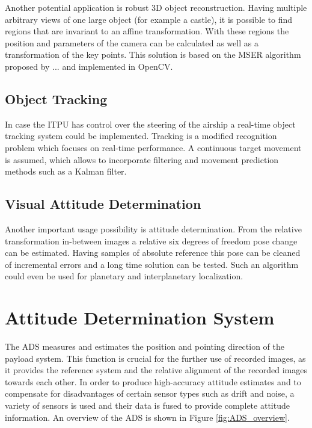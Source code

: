 Another potential application is robust 3D object reconstruction. Having multiple arbitrary views of one large object (for example a castle), it is possible to find regions that are invariant to an affine transformation. With these regions the position and parameters of the camera can be calculated as well as a transformation of the key points. This solution is based on the MSER algorithm proposed by ... and implemented in OpenCV.

\subsection{Object Tracking}

In case the \ac{ITPU} has control over the steering of the airship a real-time object tracking system could be implemented. Tracking is a modified recognition problem which focuses on real-time performance. A continuous target movement is assumed, which allows to incorporate filtering and movement prediction methods such as a Kalman filter. 

\subsection{Visual Attitude Determination}

Another important usage possibility is attitude determination. From the relative transformation in-between images a relative six degrees of freedom pose change can be estimated. Having samples of absolute reference this pose can be cleaned of incremental errors and a long time solution can be tested. Such an algorithm could even be used for planetary and interplanetary localization.

\FloatBarrier
\section{Attitude Determination System}

The \ac{ADS} measures and estimates the position and pointing direction of the payload system. This function is crucial for the further use of recorded images, as it provides the reference system and the relative alignment of the recorded images towards each other. In order to produce high-accuracy attitude estimates and to compensate for disadvantages of certain sensor types such as drift and noise, a variety of sensors is used and their data is fused to provide complete attitude information. An overview of the \ac{ADS} is shown in Figure \ref{fig:ADS_overview}.
\vspace{1.0em}

